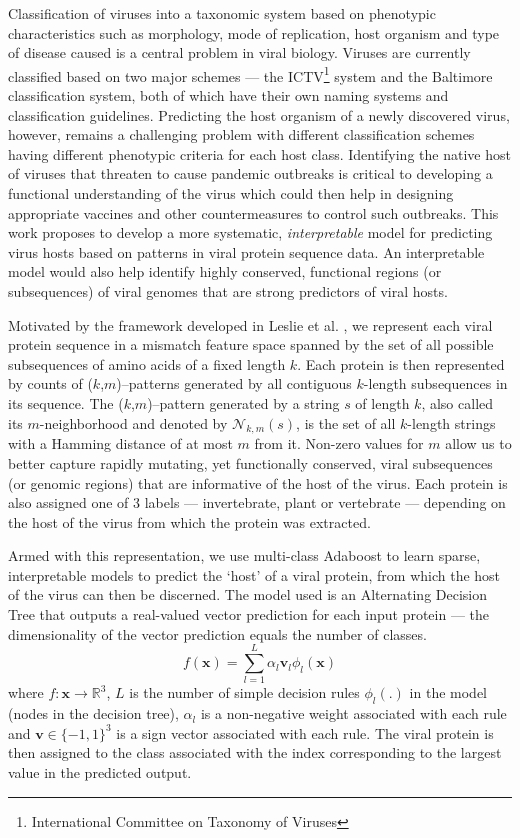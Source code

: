 Classification of viruses into a taxonomic system based on phenotypic characteristics
such as morphology, mode of replication, host organism and type of disease caused is
a central problem in viral biology. Viruses are currently classified based on two major
schemes --- the ICTV\footnote{International Committee on Taxonomy of Viruses} system
and the Baltimore classification system, both of which have their own naming systems
and classification guidelines. Predicting the host organism of a newly discovered virus,
however, remains a challenging problem with different classification schemes having
different phenotypic criteria for each host class. Identifying the native 
host of viruses that threaten to cause pandemic outbreaks is critical to developing a 
functional understanding of the virus which could then help in designing appropriate 
vaccines and other countermeasures to control such outbreaks. This work proposes to 
develop a more systematic, 
\emph{interpretable} model for predicting virus hosts based on patterns in viral protein sequence data. 
An interpretable model would also help identify highly conserved, functional regions (or subsequences) 
of viral genomes that are strong predictors of viral hosts.

Motivated by the framework developed in Leslie et al. \cite{leslie}, we represent each viral protein
sequence in a mismatch feature space spanned by the set of all possible subsequences of amino acids
of a fixed length $k$. Each protein is then represented by counts of ($k$,$m$)--patterns
generated by all contiguous $k$-length subsequences in its sequence. The ($k$,$m$)--pattern 
generated by a string $s$ of length $k$, also called its $m$-neighborhood and denoted by 
$\mathcal{N}_{k,m}(s)$, is the set of all $k$-length strings with a Hamming distance of
at most $m$ from it. Non-zero values for $m$ allow us to better capture rapidly mutating, 
yet functionally conserved, viral subsequences (or genomic regions) that are informative 
of the host of the virus. Each protein is also assigned one of 3 labels --- invertebrate, plant
or vertebrate --- depending on the host of the virus from which the protein was extracted.

Armed with this representation, we use multi-class Adaboost\cite{adaboost, multiclass} to learn sparse, 
interpretable models to predict the `host' of a viral protein, from which the host of the virus can then
be discerned. The model used is an Alternating Decision Tree\cite{adts} that outputs a real-valued vector 
prediction for each input protein --- the dimensionality of the vector prediction equals the number of 
classes. 
\begin{equation}
f(\mathbf{x}) = \sum_{l=1}^{L} \alpha_l \mathbf{v}_l \phi_l(\mathbf{x})
\end{equation}
where $f : \mathbf{x} \rightarrow \mathbb{R}^3$, $L$ is the number of simple decision rules 
$\phi_l(.)$ in the model (nodes in the decision tree), $\alpha_l$ is a non-negative weight 
associated with each rule and $\mathbf{v} \in \{-1,1 \}^3$ is a sign vector associated with each 
rule. The viral protein is then assigned to the class associated with the index corresponding
to the largest value in the predicted output.

